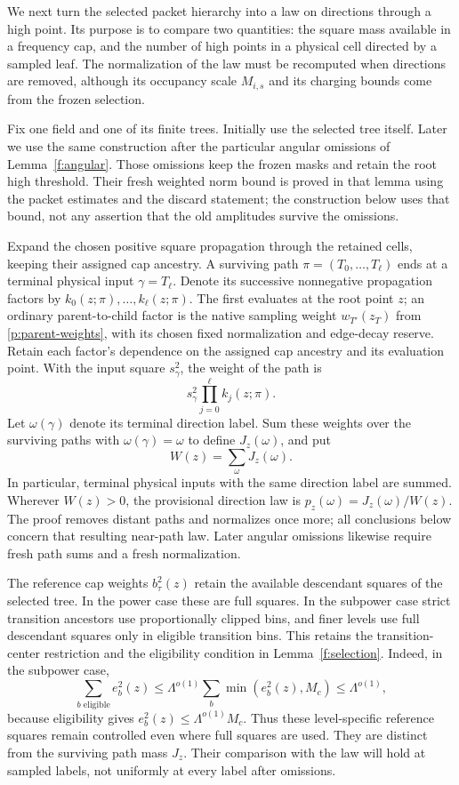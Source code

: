 We next turn the selected packet hierarchy into a law on directions
through a high point. Its purpose is to compare two quantities: the
square mass available in a frequency cap, and the number of high points
in a physical cell directed by a sampled leaf. The normalization of the
law must be recomputed when directions are removed, although its
occupancy scale $M_{i,s}$ and its charging bounds come from the frozen
selection.

Fix one field and one of its finite trees. Initially use the selected
tree itself. Later we use the same construction after the particular
angular omissions of Lemma~\ref{f:angular}. Those omissions keep the
frozen masks and retain the root high threshold. Their fresh weighted
norm bound is proved in that lemma using the packet estimates and the
discard statement; the construction below uses that bound, not any
assertion that the old amplitudes survive the omissions.

Expand the chosen positive square propagation through the retained
cells, keeping their assigned cap ancestry. A surviving path
$\pi=(T_0,\ldots,T_\ell)$ ends at a terminal physical input
$\gamma=T_\ell$. Denote its successive nonnegative propagation factors
by $k_0(z;\pi),\ldots,k_\ell(z;\pi)$. The first evaluates at the root
point $z$; an ordinary parent-to-child factor is the native sampling
weight $w_{T'}(z_T)$ from \eqref{p:parent-weights}, with its chosen
fixed normalization and edge-decay reserve. Retain each factor's
dependence on the assigned cap ancestry and its evaluation point.
With the input square $s_\gamma^2$, the weight of the path is
\[
 s_\gamma^2\prod_{j=0}^{\ell}k_j(z;\pi).
\]
Let $\omega(\gamma)$ denote its terminal direction label. Sum these
weights over the surviving paths with $\omega(\gamma)=\omega$ to define
$J_z(\omega)$, and put
\[
 W(z)=\sum_\omega J_z(\omega).
\]
In particular, terminal physical inputs with the same direction label
are summed. Wherever $W(z)>0$, the provisional direction law is
$p_z(\omega)=J_z(\omega)/W(z)$. The proof removes distant paths and
normalizes once more; all conclusions below concern that resulting
near-path law. Later angular omissions likewise require fresh path
sums and a fresh normalization.

The reference cap weights $b_\tau^2(z)$ retain the available descendant
squares of the selected tree. In the power case these are full squares.
In the subpower case strict transition ancestors use proportionally
clipped bins, and finer levels use full descendant squares only in
eligible transition bins. This retains the transition-center restriction
and the eligibility condition in Lemma~\ref{f:selection}. Indeed,
in the subpower case,
\[
 \sum_{b\text{ eligible}}e_b^2(z)
 \leq\Lambda^{o(1)}\sum_b\min(e_b^2(z),M_c)
 \leq\Lambda^{o(1)},
\]
because eligibility gives $e_b^2(z)\leq\Lambda^{o(1)}M_c$.
Thus these level-specific reference squares remain controlled even
where full squares are used. They are distinct from the surviving
path mass $J_z$. Their comparison with the law will hold at sampled
labels, not uniformly at every label after omissions.

